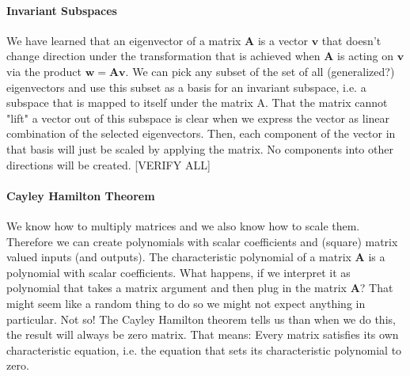 

\paragraph{Invariant Subspaces}
We have learned that an eigenvector of a matrix $\mathbf{A}$ is a vector $\mathbf{v}$ that doesn't change direction under the transformation that is achieved when $\mathbf{A}$ is acting on  $\mathbf{v}$ via the product $\mathbf{w} = \mathbf{A} \mathbf{v}$. We can pick any subset of the set of all (generalized?) eigenvectors and use this subset as a basis for an invariant subspace, i.e. a subspace that is mapped to itself under the matrix A. That the matrix cannot "lift" a vector out of this subspace is clear when we express the vector as linear combination of the selected eigenvectors. Then, each component of the vector in that basis will just be scaled by applying the matrix. No components into other directions will be created. [VERIFY ALL]





\paragraph{Cayley Hamilton Theorem}
We know how to multiply matrices and we also know how to scale them. Therefore we can create polynomials with scalar coefficients and (square) matrix valued inputs (and outputs). The characteristic polynomial of a matrix $\mathbf{A}$ is a polynomial with scalar coefficients. What happens, if we interpret it as polynomial that takes a matrix argument and then plug in the matrix $\mathbf{A}$? That might seem like a random thing to do so we might not expect anything in particular. Not so! The Cayley Hamilton theorem tells us than when we do this, the result will always be zero matrix. That means: Every matrix satisfies its own characteristic equation, i.e. the equation that sets its characteristic polynomial to zero.

